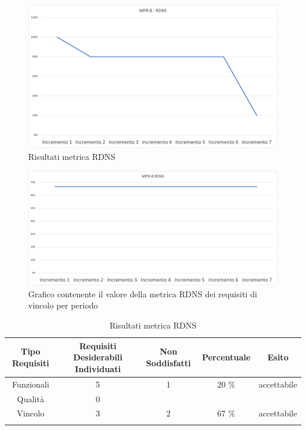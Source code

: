 \begin{center}
        \begin{figure}[!htb]
        \centering
        \includegraphics[scale=0.40]{res/images/RQRDNS.png}
        \caption{Risultati metrica RDNS}
    \end{figure}
    \begin{figure}[!htb]
        \centering
        \includegraphics[scale=0.40]{res/images/RQRDNSVINCOLO.png}
        \caption{Grafico contenente il valore della metrica RDNS dei requisiti di vincolo per periodo}
    \end{figure}
    \begin{center}
    \end{center}
\end{center}

\begin{center}
    \begin{longtable}{|c|c|c|c|c|}
        \hline
        \rowcolor{lighter-grayer}
        \textbf {Tipo Requisiti} & \textbf{Requisiti Desiderabili Individuati} & \textbf{Non Soddisfatti} & \textbf{Percentuale} & \textbf{Esito} \\ \hline
        \endfirsthead

        \hline
        Funzionali & 5 & 1 & 20 \%  &  accettabile                \\
           Qualità & 0 &  &  &                        \\
           Vincolo & 3 &  2 &  67 \%&    accettabile                    \\ 
        \hline
        \rowcolor{white}
        \caption{Risultati metrica RDNS}
    \end{longtable}
\end{center}

\newpage

